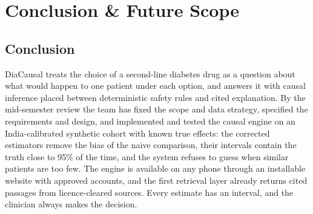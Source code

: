\chapter{Conclusion \& Future Scope}\label{chap6}
\newpage
\section{Conclusion}
DiaCausal treats the choice of a second-line diabetes drug as a question about what would happen to one patient under each option, and answers it with causal inference placed between deterministic safety rules and cited explanation. By the mid-semester review the team has fixed the scope and data strategy, specified the requirements and design, and implemented and tested the causal engine on an India-calibrated synthetic cohort with known true effects: the corrected estimators remove the bias of the naive comparison, their intervals contain the truth close to 95\% of the time, and the system refuses to guess when similar patients are too few. The engine is available on any phone through an installable website with approved accounts, and the first retrieval layer already returns cited passages from licence-cleared sources. Every estimate has an interval, and the clinician always makes the decision.

